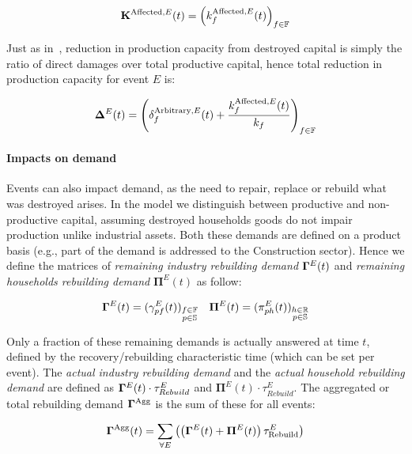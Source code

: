 \documentclass[main.tex]{subfiles}
\begin{document}
\[
  \mathbf{K}^{\textrm{Affected},E}(t) = \left (k^{\textrm{Affected},E}_f(t) \right )_{f \in \mathbb{F}}
\]

Just as in~\textcite{hallegatte-2013-model-role}, reduction in
production capacity from destroyed capital is simply the ratio of direct damages
over total productive capital, hence total reduction in production capacity for
event $E$ is:

\[
  \bm{\Delta}^{E}(t) = \left ( \delta^{\textrm{Arbitrary},E}_f(t) +
    \frac{k^{\textrm{Affected},E}_f(t)}{k_f} \right )_{f \in \mathbb{F}}
\]

\paragraph{Impacts on demand}
\label{sec:impacts-demand}

Events can also impact demand, as the need to repair, replace or rebuild what was
destroyed arises. In the model we distinguish between productive and
non-productive capital, assuming destroyed households goods do not impair
production unlike industrial assets. Both these demands are defined on a
product basis (e.g., part of the demand is addressed to the Construction
sector).
Hence we define the matrices of \emph{remaining industry
  rebuilding demand} $\mathbf{\Gamma}^E(t)$ and \emph{remaining households rebuilding demand}
$\bm{\Pi}^E(t)$ as follow:

\begin{align*}
  \mathbf{\Gamma}^{E}(t) = (\gamma^{E}_{pf}(t))_{\substack{f \in \mathbb{F}\\p \in \mathbb{S}}} &&  \bm{\Pi}^{E}(t) = (\pi^{E}_{ph}(t))_{\substack{h \in \mathbb{R}\\p \in \mathbb{S}}}
\end{align*}

Only a fraction of these remaining demands is actually
answered at time $t$, defined by the recovery/rebuilding
characteristic time (which can be set per event). The \emph{actual industry
  rebuilding demand} and the \emph{actual household rebuilding demand} are
defined as $\mathbf{\Gamma}^{E}(t) \cdot \tau^{E}_{Rebuild} $ and $\bm{\Pi}^{E}(t)
\cdot \tau^{E}_{Rebuild}$. The aggregated or total rebuilding demand
$\mathbf{\Gamma}^{\textrm{Agg}}$ is the sum of these for all events:

\label{agg_rebuilding_demand}

\[
  \mathbf{\Gamma}^{\textrm{Agg}}(t) = \sum_{\forall E} \left ( \left ( \mathbf{\Gamma}^E(t) +
    \bm{\Pi}^{E}(t) \right ) \tau^E_{\textrm{Rebuild}} \right )
\]
\end{document}
